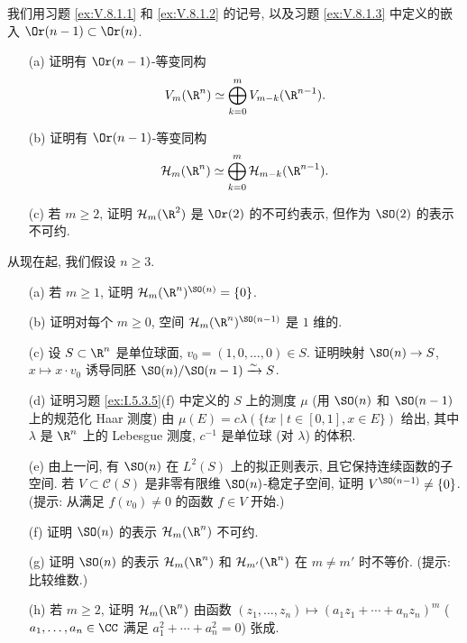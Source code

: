 \begin{exercise}[调和表示]
\label{ex:V.8.1.4}
我们用习题 \ref{ex:V.8.1.1} 和 \ref{ex:V.8.1.2} 的记号, 以及习题 \ref{ex:V.8.1.3} 中定义的嵌入 $\Or(n-1) \subset \Or(n)$.
\begin{enumerate}
\item[(a)] 证明有 $\Or(n-1)$-等变同构
\[
V_m(\R^n) \simeq \bigoplus_{k=0}^m V_{m-k}(\R^{n-1}).
\]
\item[(b)] 证明有 $\Or(n-1)$-等变同构
\[
\mathcal{H}_m(\R^n) \simeq \bigoplus_{k=0}^m\mathcal{H}_{m-k}(\R^{n-1}).
\]
\item[(c)] 若 $m \geq 2$, 证明 $\mathcal{H}_m(\R^2)$ 是 $\Or(2)$ 的不可约表示, 但作为 $\SO(2)$ 的表示不可约.
\end{enumerate}
从现在起, 我们假设 $n \geq 3$.
\begin{enumerate}
\item[(a)] 若 $m \geq 1$, 证明 $\mathcal{H}_m(\R^n)^{\SO(n)} = \{0\}$.
\item[(b)] 证明对每个 $m \geq 0$, 空间 $\mathcal{H}_m(\R^n)^{\SO(n-1)}$ 是 $1$ 维的.
\item[(c)] 设 $S \subset \R^n$ 是单位球面, $v_0 = (1, 0, \ldots, 0) \in S$. 证明映射 $\SO(n) \to S$, $x \longmapsto x \cdot v_0$ 诱导同胚 $\SO(n)/\SO(n-1) \xrightarrow{\sim} S$.
\item[(d)] 证明习题 \ref{ex:I.5.3.5}(f) 中定义的 $S$ 上的测度 $\mu$ (用 $\SO(n)$ 和 $\SO(n-1)$ 上的规范化 Haar 测度) 由 $\mu(E) = c\lambda(\{tx \mid t \in [0,1], x \in E\})$ 给出, 其中 $\lambda$ 是 $\R^n$ 上的 Lebesgue 测度, $c^{-1}$ 是单位球 (对 $\lambda$) 的体积.
\item[(e)] 由上一问, 有 $\SO(n)$ 在 $L^2(S)$ 上的拟正则表示, 且它保持连续函数的子空间. 若 $V \subset \mathcal{C}(S)$ 是非零有限维 $\SO(n)$-稳定子空间, 证明 $V^{\SO(n-1)} \neq \{0\}$. (提示: 从满足 $f(v_0) \neq 0$ 的函数 $f \in V$ 开始.)
\item[(f)] 证明 $\SO(n)$ 的表示 $\mathcal{H}_m(\R^n)$ 不可约.
\item[(g)] 证明 $\SO(n)$ 的表示 $\mathcal{H}_m(\R^n)$ 和 $\mathcal{H}_{m'}(\R^n)$ 在 $m \neq m'$ 时不等价. (提示: 比较维数.)
\item[(h)] 若 $m \geq 2$, 证明 $\mathcal{H}_m(\R^n)$ 由函数 $(z_1, \ldots, z_n) \longmapsto (a_1z_1 + \cdots + a_nz_n)^m$ ($a_1, \ldots, a_n \in \CC$ 满足 $a_1^2 + \cdots + a_n^2 = 0$) 张成.
\end{enumerate}
\end{exercise}

